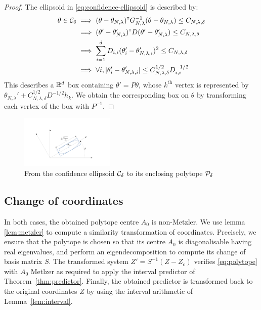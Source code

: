 \documentclass{article}
\begin{document}
\begin{proof}
The ellipsoid in \eqref{eq:confidence-ellipsoid} is described by:
\begin{align*}
    \theta\in\mathcal{C}_\delta &\implies
    (\theta-\theta_{N,\lambda})^{\mathsf{\scriptscriptstyle T}} G_{N,\lambda}^{-1}(\theta-\theta_{N,\lambda}) \leq C_{N,\lambda,\delta}\\
    &\implies (\theta'-\theta'_{N,\lambda})^{\mathsf{\scriptscriptstyle T}} D (\theta'-\theta'_{N,\lambda}) \leq C_{N,\lambda,\delta}\\
    &\implies \sum_{i=1}^d D_{i,i}(\theta'_i-\theta'_{N,\lambda,i})^2\leq C_{N,\lambda,\delta}\\
    &\implies\forall i, |\theta'_i-\theta'_{N,\lambda,i}|\leq C_{N,\lambda,\delta}^{1/2}D_{i,i}^{-1/2}
\end{align*}
This describes a $\mathbb{R}^d$ box containing $\theta' = P\theta$, whose $k^\text{th}$ vertex is represented by $\theta_{N,\lambda}' + C_{N,\lambda,\delta}^{1/2}D^{-1/2} h_k$. We obtain the corresponding box on $\theta$ by transforming each vertex of the box with $P^{-1}$.
\end{proof}

\begin{figure}
    \centering
    \includegraphics[trim={3.8cm, 2cm, 5cm, 3.8cm}, clip, width=0.4\textwidth]{img/ellipsoid_to_polytope}
    \caption{From the confidence ellipsoid $\mathcal{C}_\delta$ to its enclosing polytope $\mathcal{P}_\delta$}
    \label{fig:ellipsoid_to_polytope}
\end{figure}

\subsection{Change of coordinates}
In both cases, the obtained polytope centre $A_0$ is non-Metzler.
We use lemma \ref{lem:metzler} to compute a similarity transformation of coordinates. Precisely, we ensure that the polytope is chosen so that its centre $A_0$ is diagonalisable having real eigenvalues, and perform an eigendecomposition to compute its change of basis matrix $S$. The transformed system $Z'=S^{-1}(Z-Z_c)$ verifies \eqref{eq:polytope} with $A_0$ Metlzer as required to apply the interval predictor of Theorem~\ref{thm:predictor}. Finally, the obtained predictor is transformed back to the original coordinates $Z$ by using the interval arithmetic of Lemma~\ref{lem:interval}.
\end{document}
